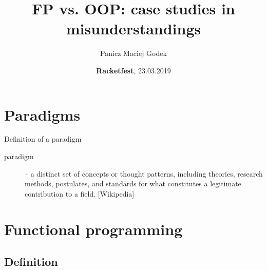 \documentclass{beamer}
\title{\textbf{FP vs. OOP: case studies in misunderstandings}}
\author{Panicz Maciej Godek}
\institute{
  \tiny{\href{mailto:godek.maciek@gmail.com}{\textbf{godek.maciek@gmail.com}}}
}
\date{\textbf{Racketfest}, 23.03.2019}
\begin{document}
\begin{frame}
  \titlepage
\end{frame}

\section{Paradigms}

\begin{frame}{Definition of a paradigm}
  \begin{description}
  \item [paradigm] -- a distinct set of concepts or thought
    patterns, including theories, research methods, postulates,
    and standards for what constitutes a legitimate contribution
    to a field. [Wikipedia]
  \end{description}
\end{frame}

{ %
  \begin{frame}[plain]
  \end{frame}
}


\section{Functional programming}

\subsection{Definition}
\end{document}
